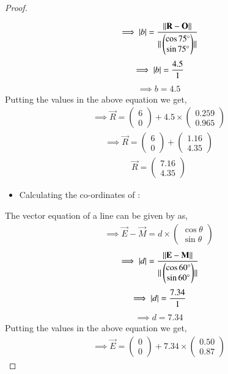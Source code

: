\documentclass[journal,12pt,twocolumn]{IEEEtran}
\newcommand{\myvec}[1]{\ensuremath{\begin{pmatrix}#1\end{pmatrix}}}
\begin{document}
\begin{enumerate}
\begin{proof}
\begin{align}
 \end{align}
  \begin{align}
    \implies \abs{b}=\frac{{\norm{\vec{R}-\vec{O}}}}{{\norm{\myvec{\cos75\degree\\\sin75\degree}}}} 
\end{align}
\begin{align}
 \implies \vert b\vert= \frac{4.5}{1}
\end{align}
\begin{align}
    \implies b = 4.5 
\end{align}
 Putting the values in the above equation we get,
 \begin{align}
     \implies \vec{R}= \myvec{6\\0}+4.5 \times \myvec{0.259\\0.965}
 \end{align}
 \begin{align}
     \implies \vec{R}= \myvec{6\\0}+\myvec{1.16\\4.35}
 \end{align}
 \begin{align}
     \vec{R}= \myvec{7.16\\4.35}
 \end{align}
\begin{itemize}
     \item Calculating the co-ordinates of :\\
 \end{itemize}
 The vector equation of a line can be given by as,
  \begin{align}
     \implies  \vec{E}-\vec{M}= d \times \myvec{\cos\theta\\\sin\theta}
 \end{align}
 \begin{align}
    \implies \abs{d}= \frac{{\norm{\vec{E}-\vec{M}}}}{{\norm{\myvec{\cos60\degree\\\sin60\degree}}}}
\end{align}
\begin{align}
   \implies  \vert d\vert= \frac{7.34}{1}
\end{align}
\begin{align}
    \implies d = 7.34
\end{align}
 Putting the values in the above equation we get,
 \begin{align}
     \implies \vec{E}= \myvec{0\\0}+7.34 \times \myvec{0.50\\0.87}
 \end{align}

\end{proof}
\end{enumerate}
\end{document}
